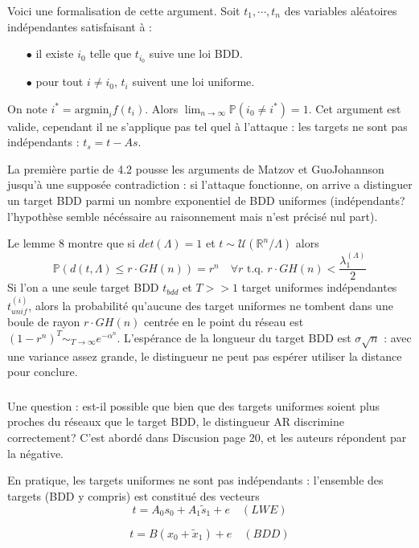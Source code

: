 \documentclass{article}
\begin{document}
Voici une formalisation de cette argument. Soit $t_1,\cdots ,t_n$ des variables aléatoires indépendantes satisfaisant à :
\begin{itemize}
\item[$\bullet$] il existe $i_0$ telle que $t_{i_0}$ suive une loi BDD.
\item[$\bullet$] pour tout $i\neq i_0$, $t_i$ suivent une loi uniforme.
\end{itemize}
On note $i^* = \text{argmin}_i f(t_i) . $
Alors $\lim_{n\rightarrow \infty } \mathbb P(i_0\neq i^* ) =1$. Cet argument est valide, cependant il ne s'applique pas tel quel à l'attaque : les targets ne sont pas indépendants : $t_s = t - As $.

La première partie de 4.2 pousse les arguments de Matzov et GuoJohannson jusqu'à une supposée contradiction : si l'attaque fonctionne, on arrive a distinguer un target BDD parmi un nombre exponentiel de BDD uniformes (indépendants? l'hypothèse semble nécéssaire au raisonnement mais n'est précisé nul part).  

Le lemme 8 montre que si $det(\Lambda) = 1$ et $t\sim\mathcal U(\mathbb R^n /\Lambda)$ alors
$$\mathbb P( d(t , \Lambda ) \leq r\cdot GH(n) ) =  r^n \quad \forall r \text{ t.q. } r \cdot GH(n) < \frac{\lambda_1^{(\Lambda)}}{2}$$
Si l'on a une seule target BDD $t_{bdd}$ et $T>>1$ target uniformes indépendantes $t^{(i)}_{unif}$, alors la probabilité qu'aucune des target uniformes ne tombent dans une boule de rayon $r\cdot GH(n)$ centrée en le point du réseau est $(1-r^n)^T \sim_{T\rightarrow \infty} e^{-\alpha^n}$. L'espérance de la longueur du target BDD est $\sigma \sqrt n $ : avec une variance assez grande, le distingueur ne peut pas espérer utiliser la distance pour conclure.

\subsubsection{}

Une question : est-il possible que bien que des targets uniformes soient plus proches du réseaux que le target BDD, le distingueur AR discrimine correctement? C'est abordé dans Discusion page 20, et les auteurs répondent par la négative.

En pratique, les targets uniformes ne sont pas indépendants : l'ensemble des targets (BDD y compris) est constitué des vecteurs 
$$ t = A_0 s_0 +A_1 \tilde s_1 + e \quad (LWE) $$

$$ t = B (x_0 + \tilde x_1 ) + e \quad (BDD) $$
\end{document}
